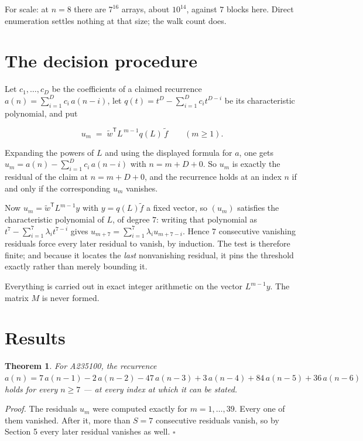\documentclass[11pt]{article}
\newtheorem{theorem}{Theorem}
\theoremstyle{definition}
\begin{document}
For scale: at $n = 8$ there are $7^{16}$ arrays, about $10^{14}$, against $7$ blocks here. Direct enumeration settles nothing at that size; the walk count does.

\section{The decision procedure}

Let $c_1,\dots,c_D$ be the coefficients of a claimed recurrence $a(n) = \sum_{i=1}^{D} c_i\,a(n-i)$, let $q(t) = t^{D} - \sum_{i=1}^{D} c_i t^{D-i}$ be its characteristic polynomial, and put

\[u_m \;=\; \tilde w^{\mathsf T} L^{\,m-1} q(L)\,\tilde f \qquad (m \ge 1).\]

Expanding the powers of $L$ and using the displayed formula for $a$, one gets $u_m = a(n) - \sum_{i=1}^{D} c_i\,a(n-i)$ with $n = m + D + 0$. So $u_m$ is exactly the residual of the claim at $n = m + D + 0$, and the recurrence holds at an index $n$ if and only if the corresponding $u_m$ vanishes.

Now $u_m = \tilde w^{\mathsf T} L^{m-1} y$ with $y = q(L)\tilde f$ a fixed vector, so $(u_m)$ satisfies the characteristic polynomial of $L$, of degree $7$: writing that polynomial as $t^{7} - \sum_{i=1}^{7} \lambda_i t^{7-i}$ gives $u_{m+7} = \sum_{i=1}^{7} \lambda_i u_{m+7-i}$. Hence $7$ consecutive vanishing residuals force every later residual to vanish, by induction. The test is therefore finite; and because it locates the {\itshape last} nonvanishing residual, it pins the threshold exactly rather than merely bounding it.

Everything is carried out in exact integer arithmetic on the vector $L^{m-1}y$. The matrix $M$ is never formed.

\section{Results}

\begin{theorem} For A235100, the recurrence $a(n) = 7\,a(n-1) - 2\,a(n-2) - 47\,a(n-3) + 3\,a(n-4) + 84\,a(n-5) + 36\,a(n-6)$ holds for every $n \ge 7$ --- at every index at which it can be stated.\end{theorem}

{\itshape Proof.} The residuals $u_m$ were computed exactly for $m = 1,\dots,39$. Every one of them vanished. After it, more than $S = 7$ consecutive residuals vanish, so by Section 5 every later residual vanishes as well. $\square$
\end{document}
